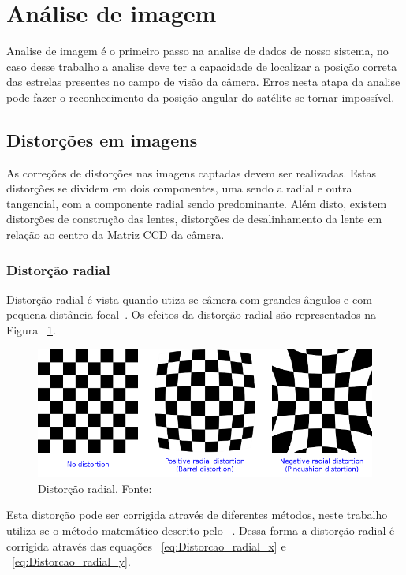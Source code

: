 \section{Análise de imagem}

Analise de imagem é o primeiro passo na analise de dados de nosso sistema, 
no caso desse trabalho a analise deve ter a capacidade de localizar a posição correta das estrelas presentes no campo de visão da câmera.
Erros nesta atapa da analise pode fazer o reconhecimento da posição angular do satélite se tornar impossível.

\subsection{Distorções em imagens}

As correções de distorções nas imagens captadas devem ser realizadas. 
Estas distorções se dividem em dois componentes, uma sendo a radial e outra tangencial, com a componente radial sendo predominante.
Além disto, existem distorções de construção das lentes, distorções de desalinhamento da lente em relação ao centro da Matriz CCD da câmera.

\subsubsection{Distorção radial}
\label{subsubsec:distorcao_radial}

Distorção radial é vista quando utiza-se câmera com grandes ângulos e com pequena distância focal~\cite[]{Mallon}.
Os efeitos da distorção radial são representados na Figura ~\ref{fig:Distorcao_radial}.

\begin{figure}[H]
	\centering
	\includegraphics[width=.7\columnwidth]{images/Distorcao_radial.png}
	\caption{Distorção radial. Fonte: ~\cite[]{ozcakir_2020}}
	\label{fig:Distorcao_radial}
\end{figure}

Esta distorção pode ser corrigida através de diferentes métodos, neste trabalho utiliza-se o método matemático descrito pelo ~\cite[]{opencv_library}.
Dessa forma a distorção radial é corrigida através das equações ~\ref{eq:Distorcao_radial_x} e ~\ref{eq:Distorcao_radial_y}.

